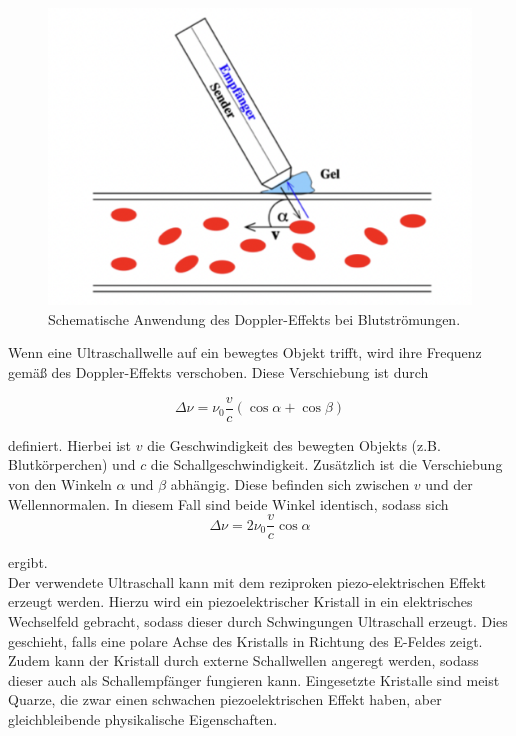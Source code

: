 \begin{figure}[H]
    \centering
    \includegraphics[width=\textwidth]{content/doppler.png}
    \caption{Schematische Anwendung des Doppler-Effekts bei Blutströmungen.\cite{anleitung}}
    \label{fig:blut}
\end{figure}

\noindent Wenn eine Ultraschallwelle auf ein bewegtes Objekt trifft, wird ihre Frequenz gemäß des Doppler-Effekts
verschoben. Diese Verschiebung ist durch

\begin{equation}
    \Delta\nu = \nu_0\dfrac{v}{c}(\cos{\alpha}+\cos{\beta})
    \label{eq:drei}
\end{equation}

\noindent definiert. Hierbei ist $v$ die Geschwindigkeit des bewegten Objekts (z.B. Blutkörperchen) und $c$ die Schallgeschwindigkeit.  
Zusätzlich ist die Verschiebung von den Winkeln $\alpha$ und $\beta$ abhängig. Diese befinden sich zwischen $v$ und der Wellennormalen.
In diesem Fall sind beide Winkel identisch, sodass sich 
\begin{equation}
    \Delta\nu = 2\nu_0\dfrac{v}{c}\cos{\alpha}
    \label{eq:vier}
\end{equation}

\noindent ergibt.\\
Der verwendete Ultraschall kann mit dem reziproken piezo-elektrischen Effekt erzeugt werden. 
Hierzu wird ein piezoelektrischer Kristall in ein elektrisches Wechselfeld gebracht, sodass 
dieser durch Schwingungen Ultraschall erzeugt. Dies geschieht, falls eine polare Achse des 
Kristalls in Richtung des E-Feldes zeigt. Zudem kann der Kristall durch externe Schallwellen
angeregt werden, sodass dieser auch als Schallempfänger fungieren kann. Eingesetzte Kristalle 
sind meist Quarze, die zwar einen schwachen piezoelektrischen Effekt haben, aber gleichbleibende 
physikalische Eigenschaften.

